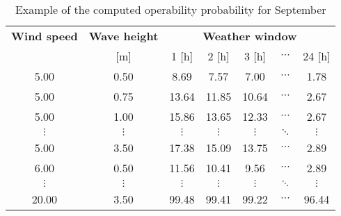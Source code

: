 \begin{table}
\label{tab:proba}
\begin{tabular}{ccccccc}
\hline
{\bf Wind speed} & {\bf Wave height} & \multicolumn{ 5}{c}{{\bf Weather window}} \\
     [m/s]      &      [m]      &          1 [h] &          2 [h] &          3 [h] &  $\cdots$ &         24 [h] \\
\hline
      5.00 &       0.50 &       8.69 &       7.57 &       7.00 &  $\cdots$ &       1.78 \\
      5.00 &       0.75 &      13.64 &      11.85 &      10.64 &  $\cdots$ &       2.67 \\
      5.00 &       1.00 &      15.86 &      13.65 &      12.33 &  $\cdots$ &       2.67 \\
 $\vdots$ &  $\vdots$ &  $\vdots$ &  $\vdots$ &  $\vdots$ &  $\ddots$ &  $\vdots$ \\
      5.00 &       3.50 &      17.38 &      15.09 &      13.75 &  $\cdots$ &       2.89 \\
      6.00 &       0.50 &      11.56 &      10.41 &       9.56 &  $\cdots$ &       2.89 \\
 $\vdots$ &  $\vdots$ &  $\vdots$ &  $\vdots$ &  $\vdots$ & $\ddots$           &  $\vdots$ \\
     20.00 &       3.50 &      99.48 &      99.41 &      99.22 &  $\cdots$ &      96.44 \\
\hline
\end{tabular}  

\caption{Example of the computed operability probability for September}
\end{table}